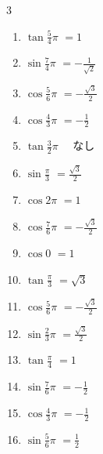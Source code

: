 \begin{multicols}{3}
\begin{enumerate}
  \item $\displaystyle \tan{\frac{5}{4}\pi}$
        $\displaystyle =1$

  \item $\displaystyle \sin{\frac{7}{4}\pi}$
        $\displaystyle =-\frac{1}{\sqrt{2}}$

  \item $\displaystyle \cos{\frac{5}{6}\pi}$
        $\displaystyle =-\frac{\sqrt{3}}{2}$

  \item $\displaystyle \cos{\frac{4}{3}\pi}$
        $\displaystyle =-\frac{1}{2}$

  \item $\displaystyle \tan{\frac{3}{2}\pi}$
        $\displaystyle \quad なし$

  \item $\displaystyle \sin{\frac{\pi}{3}}$
        $\displaystyle =\frac{\sqrt{3}}{2}$

  \item $\displaystyle \cos{2\pi}$
        $\displaystyle =1$

  \item $\displaystyle \cos{\frac{7}{6}\pi}$
        $\displaystyle =-\frac{\sqrt{3}}{2}$

  \item $\displaystyle \cos{0}$
        $\displaystyle =1$

  \item $\displaystyle \tan{\frac{\pi}{3}}$
        $\displaystyle =\sqrt{3}$

  \item $\displaystyle \cos{\frac{5}{6}\pi}$
        $\displaystyle =-\frac{\sqrt{3}}{2}$

  \item $\displaystyle \sin{\frac{2}{3}\pi}$
        $\displaystyle =\frac{\sqrt{3}}{2}$

  \item $\displaystyle \tan{\frac{\pi}{4}}$
        $\displaystyle =1$

  \item $\displaystyle \sin{\frac{7}{6}\pi}$
        $\displaystyle =-\frac{1}{2}$

\columnbreak %

\resetques

  \item $\displaystyle \cos{\frac{4}{3}\pi}$
        $\displaystyle =-\frac{1}{2}$

  \item $\displaystyle \sin{\frac{5}{6}\pi}$
        $\displaystyle =\frac{1}{2}$


\end{enumerate}
\end{multicols}
